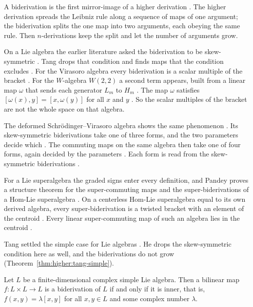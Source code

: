 A biderivation is the first mirror-image of a higher derivation
\cite[p.~2323]{FerreroHaetinger2002}. The higher derivation spreads the
Leibniz rule along a sequence of maps of one argument; the biderivation
splits the one map into two arguments, each obeying the same rule.
Then $n$-derivations keep the split and let the number of arguments grow.

On a Lie algebra the earlier literature asked the biderivation to be
skew-symmetric \cite[p.~1]{Tang2016W22}. Tang drops that condition and finds
maps that the condition excludes \cite[p.~1]{Tang2016W22}. For the Virasoro
algebra every biderivation is a scalar multiple of the bracket
\cite[Theorem~3.1, p.~7]{Tang2016W22}. For the $W$-algebra $W(2,2)$ a second
term appears, built from a linear map $\omega$ that sends each generator $L_m$
to $H_m$ \cite[Theorem~2.6, p.~7]{Tang2016W22}.
The map $\omega$ satisfies $[\omega(x),y]=[x,\omega(y)]$ for all $x$ and $y$
\cite[p.~6]{Tang2016W22}. So the scalar multiples of the bracket are not the
whole space on that algebra.

The deformed Schr\"odinger--Virasoro algebra shows the same phenomenon
\cite[p.~1]{FanSuXu2016}. Its skew-symmetric biderivations take one of three
forms, and the two parameters decide which
\cite[Theorem~3.2, p.~4]{FanSuXu2016}. The commuting maps on the same algebra
then take one of four forms, again decided by the parameters
\cite[Theorem~4.3, p.~11]{FanSuXu2016}. Each form is read from the
skew-symmetric biderivations \cite[p.~1]{FanSuXu2016}.

For a Lie superalgebra the graded signs enter every definition, and Pandey
proves a structure theorem for the super-commuting maps and the
super-biderivations of a Hom-Lie superalgebra \cite[p.~1]{Pandey2024Superbiderivations}.
On a centerless Hom-Lie superalgebra equal to its own derived algebra, every
super-biderivation is a twisted bracket with an element of the centroid
\cite[Theorem~3.8, p.~7]{Pandey2024Superbiderivations}. Every linear
super-commuting map of such an algebra lies in the centroid
\cite[Theorem~4.2, p.~11]{Pandey2024Superbiderivations}.

Tang settled the simple case for Lie algebras \cite[p.~1]{Tang2017Biderivations}. He
drops the skew-symmetric condition here as well, and the biderivations do not
grow (Theorem~\ref{thm:higher:tang-simple}).

\begin{theorem}\label{thm:higher:tang-simple}
Let $L$ be a finite-dimensional complex simple Lie algebra. Then a bilinear map
$f\colon L\times L\to L$ is a biderivation of $L$ if and only if it is inner, that
is, $f(x,y)=\lambda[x,y]$ for all $x,y\in L$ and some complex number $\lambda$.
\end{theorem}

